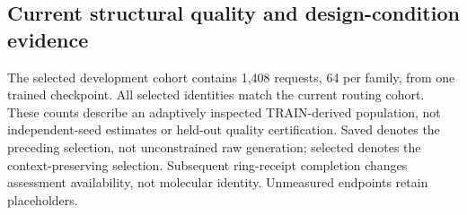 \subsection{Current structural quality and design-condition evidence}
The selected development cohort contains 1,408 requests, 64 per family, from one trained checkpoint. All selected identities match the current routing cohort. These counts describe an adaptively inspected TRAIN-derived population, not independent-seed estimates or held-out quality certification. Saved denotes the preceding selection, not unconstrained raw generation; selected denotes the context-preserving selection. Subsequent ring-receipt completion changes assessment availability, not molecular identity. Unmeasured endpoints retain placeholders.
\begingroup\scriptsize\setlength{\tabcolsep}{2.5pt}\renewcommand{\arraystretch}{1.1}
